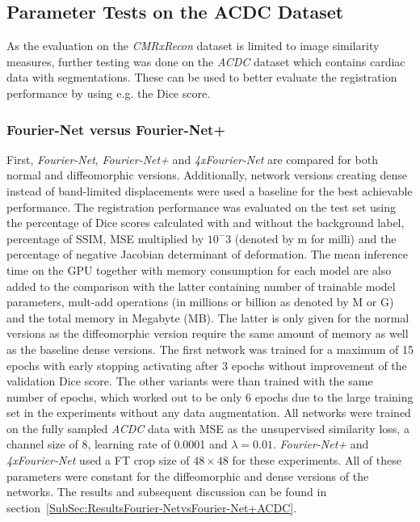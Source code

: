 \subsection{Parameter Tests on the ACDC Dataset} \label{SubSec:ParameterTestsACDC}
As the evaluation on the \emph{CMRxRecon} dataset is limited to image similarity measures, further testing was done on the \emph{ACDC} dataset which contains cardiac data with segmentations. These can be used to better evaluate the registration performance by using e.g. the Dice score.


\subsubsection{Fourier-Net versus Fourier-Net+} \label{SubSubSec:Fourier-NetvsFourier-Net+}
First, \emph{Fourier-Net}, \emph{Fourier-Net+} and \emph{4xFourier-Net} are compared for both normal and diffeomorphic versions. Additionally, network versions creating dense instead of band-limited displacements were used a baseline for the best achievable performance. The registration performance was evaluated on the test set using the percentage of Dice scores calculated with and without the background label, percentage of SSIM, MSE multiplied by $10^-3$ (denoted by m for milli) and the percentage of negative Jacobian determinant of deformation. The mean inference time on the GPU together with memory consumption for each model are also added to the comparison with the latter containing number of trainable model parameters, mult-add operations (in millions or billion as denoted by M or G) and the total memory in Megabyte (MB). The latter is only given for the normal versions as the diffeomorphic version require the same amount of memory as well as the baseline dense versions. The first network was trained for a maximum of 15 epochs with early stopping activating after 3 epochs without improvement of the validation Dice score. The other variants were than trained with the same number of epochs, which worked out to be only 6 epochs due to the large training set in the experiments without any data augmentation. All networks were trained on the fully sampled \emph{ACDC} data with MSE as the unsupervised similarity loss, a channel size of 8, learning rate of 0.0001 and $\lambda=0.01$. \emph{Fourier-Net+} and \emph{4xFourier-Net} used a FT crop size of $48 \times 48$ for these experiments. All of these parameters were constant for the diffeomorphic and dense versions of the networks. The results and subsequent discussion can be found in section~\ref{SubSec:ResultsFourier-NetvsFourier-Net+ACDC}.


